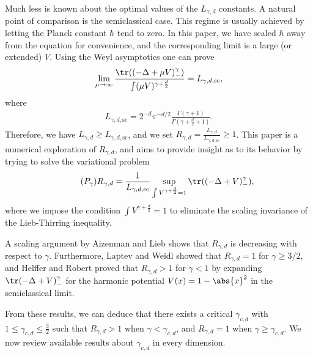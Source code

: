 \documentclass[10pt,a4paper,reqno]{amsart}
\begin{document}
Much less is known about the optimal values of the $L_{\gamma,d}$
constants. A natural point of comparison is the semiclassical
case. This regime is usually achieved by letting the Planck constant
$\hbar$ tend to zero. In this paper, we have scaled $\hbar$ away from
the equation for convenience, and the corresponding limit is a large
(or extended) $V$. Using the Weyl asymptotics one can prove
\begin{align*}
  \lim\limits_{\mu \to \infty}\frac{\tr((-\Delta + \mu
    V)_{-}^{\gamma})}{\int (\mu V)^{\gamma + \frac d 2}} =  L_{\gamma,d,\text{sc}},
\end{align*}
where
\begin{align*}
  L_{\gamma,d,\text{sc}} = 2^{-d} \pi^{-d/2}
  \frac{\Gamma(\gamma+1)}{\Gamma(\gamma+\frac d 2 + 1)}.
\end{align*}
Therefore, we have $L_{\gamma,d} \geq L_{\gamma,d,\text{sc}}$, and we
set $R_{\gamma,d} = \frac{L_{\gamma,d}}{L_{\gamma,d,\text{sc}}} \geq
1$. This paper is a numerical exploration of $R_{\gamma,d}$, and aims
to provide insight as to its behavior by trying to solve the
variational problem
\begin{align}
  \tag{$P_{\gamma}$}
  \label{variational}
  R_{\gamma,d} = \frac 1 {L_{\gamma,d,\text{sc}}}\sup_{\int V^{\gamma + \frac d 2} = 1} \tr((-\Delta +
    V)_{-}^{\gamma}),
  \end{align}
  where we impose the condition $\int V^{\gamma + \frac d 2} = 1$ to
  eliminate the scaling invariance of the Lieb-Thirring inequality.

  A scaling argument by Aizenman and Lieb \cite{aizenman1978semi}
  shows that $R_{\gamma,d}$ is decreasing with respect to
  $\gamma$. Furthermore, Laptev and Weidl
  \cite{laptev2000gammathreehalves} showed that $R_{\gamma,d} = 1$ for
  $\gamma \geq 3/2$, and Helffer and Robert \cite{helffer1990riesz}
  proved that $R_{\gamma,d} > 1$ for $\gamma < 1$ by expanding
  $\tr(-\Delta + V)_{-}^{\gamma}$ for the harmonic potential $V(x) = 1
  - \abs{x}^{2}$ in the semiclassical limit.

From these results, we can deduce that there exists a critical
$\gamma_{c,d}$ with $1 \leq \gamma_{c,d} \leq \frac 3 2$ such
that $R_{\gamma,d} > 1$ when $\gamma < \gamma_{c,d}$, and $R_{\gamma,d} =
1$ when $\gamma \geq \gamma_{c,d}$. We now review available results
about $\gamma_{c,d}$ in every dimension.
\end{document}
